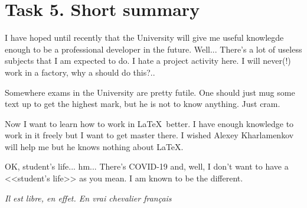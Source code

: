 \documentclass[a4paper,12pt]{report}
\begin{document}
\section*{Task 5. Short summary}
I have hoped until recently that the University will give me useful knowlegde enough to be a professional developer in the future. 
Well... There's a lot of useless subjects that I am expected to do. 
I hate a project activity here. 
I will never(!) work in a factory, why a should do this?..

Somewhere exams in the University are pretty futile. 
One should just mug some text up to get the highest mark, 
but he is not to know anything. Just cram.

Now I want to learn how to work in \LaTeX~better. 
I have enough knowledge to work in it freely but I want to get master there. 
I wished Alexey Kharlamenkov will help me but he knows nothing about \LaTeX.

OK, student's life... hm... 
There's COVID-19 and, well, 
I don't want to have a <<student's life>> as you mean. 
I am known to be the different.

\begin{center}
    \textit{Il est libre, en effet. En vrai chevalier français}
\end{center}
\end{document}
